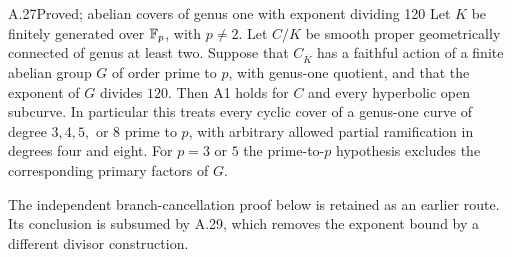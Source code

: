 \begin{claim}{A.27}{Proved; abelian covers of genus one with exponent dividing 120}
Let $K$ be finitely generated over $\mathbb F_p$, with $p\ne2$.
Let $C/K$ be smooth proper geometrically connected of
genus at least two. Suppose that $C_{\overline K}$ has a
faithful action of a finite abelian group $G$ of order
prime to $p$, with genus-one quotient, and that the
exponent of $G$ divides $120$. Then A1 holds for $C$ and
every hyperbolic open subcurve. In particular this treats
every cyclic cover of a genus-one curve of degree
$3,4,5,$ or $8$ prime to $p$, with arbitrary allowed
partial ramification in degrees four and eight. For $p=3$ or $5$
the prime-to-$p$ hypothesis excludes the corresponding
primary factors of $G$.
\end{claim}
The independent branch-cancellation proof below is retained as an
earlier route. Its conclusion is subsumed by A.29, which removes
the exponent bound by a different divisor construction.
